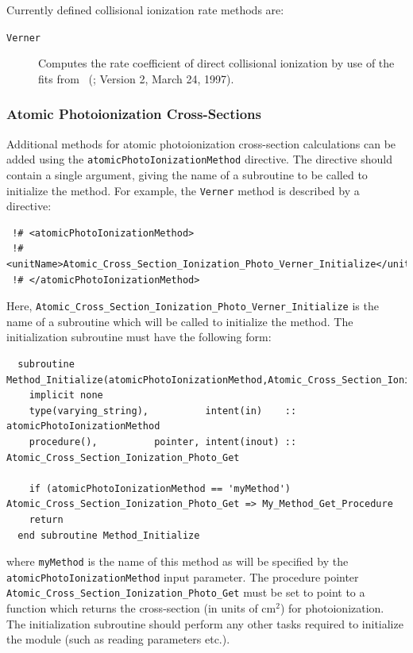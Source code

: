 Currently defined collisional ionization rate methods are:
\begin{description}
 \item [{\tt Verner}]  Computes the rate coefficient of direct collisional ionization by use of the fits from \citeauthor{voronov_practical_1997}~(\citeyear{voronov_practical_1997}; Version 2, March 24, 1997).
\end{description}

\subsubsection{Atomic Photoionization Cross-Sections}

Additional methods for atomic photoionization cross-section calculations can be added using the {\tt atomicPhotoIonizationMethod} directive. The directive should contain a single argument, giving the name of a subroutine to be called to initialize the method. For example, the {\tt Verner} method is described by a directive:
\begin{verbatim}
 !# <atomicPhotoIonizationMethod>
 !#  <unitName>Atomic_Cross_Section_Ionization_Photo_Verner_Initialize</unitName>
 !# </atomicPhotoIonizationMethod>
\end{verbatim}
Here, {\tt Atomic\_Cross\_Section\_Ionization\_Photo\_Verner\_Initialize} is the name of a subroutine which will be called to initialize the method. The initialization subroutine must have the following form:
\begin{verbatim}
  subroutine Method_Initialize(atomicPhotoIonizationMethod,Atomic_Cross_Section_Ionization_Photo_Get)
    implicit none
    type(varying_string),          intent(in)    :: atomicPhotoIonizationMethod
    procedure(),          pointer, intent(inout) :: Atomic_Cross_Section_Ionization_Photo_Get
    
    if (atomicPhotoIonizationMethod == 'myMethod') Atomic_Cross_Section_Ionization_Photo_Get => My_Method_Get_Procedure
    return
  end subroutine Method_Initialize
\end{verbatim}
where {\tt myMethod} is the name of this method as will be specified by the {\tt atomicPhotoIonizationMethod} input parameter. The procedure pointer {\tt Atomic\_Cross\_Section\_Ionization\_Photo\_Get} must be set to point to a function which returns the cross-section (in units of cm$^2$) for photoionization. The initialization subroutine should perform any other tasks required to initialize the module (such as reading parameters etc.).


